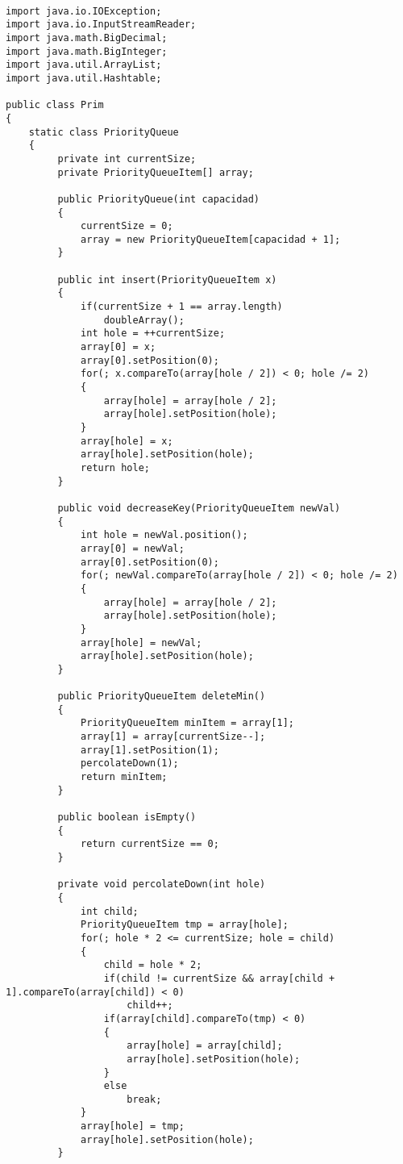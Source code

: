 \documentclass[a4paper, 11pt, oneside]{report}
\begin{document}
\begin{verbatim}

import java.io.IOException;
import java.io.InputStreamReader;
import java.math.BigDecimal;
import java.math.BigInteger;
import java.util.ArrayList;
import java.util.Hashtable;

public class Prim
{
	static class PriorityQueue
	{
	     private int currentSize;
	     private PriorityQueueItem[] array;

	     public PriorityQueue(int capacidad)  
	     {
	         currentSize = 0;
	         array = new PriorityQueueItem[capacidad + 1];
	     }

	     public int insert(PriorityQueueItem x)  
	     {
	         if(currentSize + 1 == array.length)
	             doubleArray();
	         int hole = ++currentSize;
	         array[0] = x;
	         array[0].setPosition(0);
	         for(; x.compareTo(array[hole / 2]) < 0; hole /= 2)
	         {
	             array[hole] = array[hole / 2];
	             array[hole].setPosition(hole);
	         }
	         array[hole] = x;
	         array[hole].setPosition(hole);
	         return hole;
	     }

	     public void decreaseKey(PriorityQueueItem newVal)  
	     {
	         int hole = newVal.position();
	         array[0] = newVal;
	         array[0].setPosition(0);
	         for(; newVal.compareTo(array[hole / 2]) < 0; hole /= 2)
	         {
	             array[hole] = array[hole / 2];
	             array[hole].setPosition(hole);
	         }
	         array[hole] = newVal;
	         array[hole].setPosition(hole);
	     }

	     public PriorityQueueItem deleteMin()  
	     {
	         PriorityQueueItem minItem = array[1];
	         array[1] = array[currentSize--];
	         array[1].setPosition(1);
	         percolateDown(1);
	         return minItem;
	     }

	     public boolean isEmpty()
	     {
	         return currentSize == 0;
	     }

	     private void percolateDown(int hole)
	     {
	         int child;
	         PriorityQueueItem tmp = array[hole];
	         for(; hole * 2 <= currentSize; hole = child)
	         {
	             child = hole * 2;
	             if(child != currentSize && array[child + 1].compareTo(array[child]) < 0)
	                 child++;
	             if(array[child].compareTo(tmp) < 0)
	             {
	                 array[hole] = array[child];  
	                 array[hole].setPosition(hole);
	             }
	             else
	                 break;
	         }
	         array[hole] = tmp;
	         array[hole].setPosition(hole);
	     }


\end{verbatim}
\end{document}
